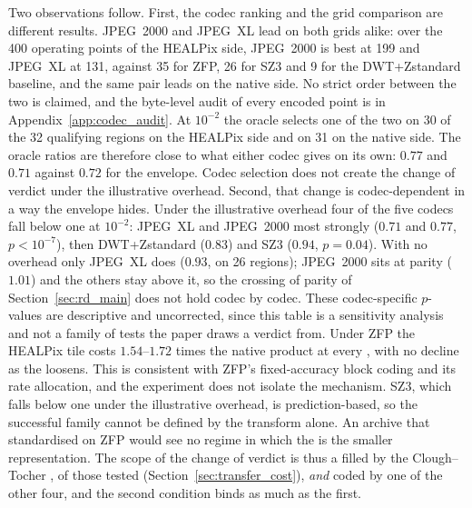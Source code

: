Two observations follow. First, the codec ranking and the grid comparison
are different results. JPEG~2000 and JPEG~XL lead on both grids alike:
over the 400 operating points of the HEALPix side, JPEG~2000 is best at
199 and JPEG~XL at 131, against 35 for ZFP, 26 for SZ3 and 9 for the
DWT+Zstandard baseline, and the same pair leads on the native side. No
strict order between the two is claimed, and the byte-level audit of
every encoded point is in Appendix~\ref{app:codec_audit}. At $10^{-2}$ the oracle selects one
of the two on 30 of the 32 qualifying regions on the HEALPix side and on
31 on the native side. The oracle ratios are therefore close to what
either codec gives on its own: $0.77$ and $0.71$ against $0.72$ for the
envelope. Codec selection does not create the change of verdict under the
illustrative overhead. Second, that change is codec-dependent in a way
the envelope hides. Under the illustrative overhead four of the five
codecs fall below one at $10^{-2}$: JPEG~XL and JPEG~2000
most strongly ($0.71$ and $0.77$, $p<10^{-7}$), then
DWT+Zstandard ($0.83$) and SZ3 ($0.94$, $p=0.04$). With no overhead
only JPEG~XL does ($0.93$, on 26 regions); JPEG~2000 sits at parity
($1.01$) and the others stay above it, so the crossing of parity of
Section~\ref{sec:rd_main} does not hold codec by codec. These codec-specific
$p$-values are descriptive and uncorrected, since this table is a
sensitivity analysis and not a family of tests the paper draws a verdict
from. Under ZFP the HEALPix tile costs $1.54$--$1.72$ times the native
product at every , with no decline as the  loosens. This is
consistent with ZFP's fixed-accuracy block coding and its rate
allocation, and the experiment does not isolate the mechanism. SZ3,
which falls below one under the illustrative overhead, is prediction-based, so the successful
family cannot be defined by the transform alone. An archive that
standardised on ZFP would see no regime in which the  is the
smaller representation. The scope of the change of verdict is thus a 
filled by the Clough--Tocher , of those tested
(Section~\ref{sec:transfer_cost}), \emph{and} coded by one of the other
four, and the second condition binds as much as the first.
